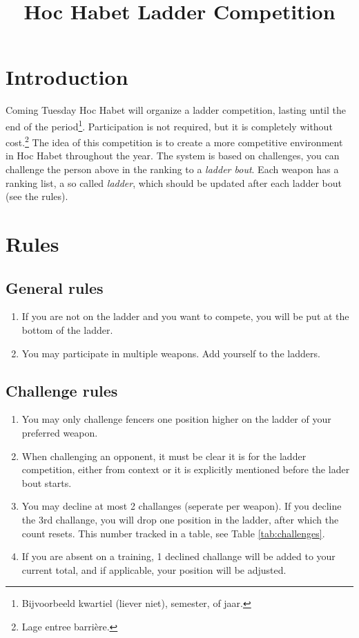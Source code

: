 \documentclass{article}
\title{Hoc Habet Ladder Competition}
\author{}
\date{}
\begin{document}
\maketitle
\section{Introduction}
Coming Tuesday Hoc Habet will organize a ladder competition, lasting until the end of the period\footnote{Bijvoorbeeld kwartiel (liever niet), semester, of jaar.}. Participation is not required, but it is completely without cost.\footnote{Lage entree barrière.} The idea of this competition is to create a more competitive environment in Hoc Habet throughout the year. The system is based on challenges, you can challenge the person above in the ranking to a \emph{ladder bout}. Each weapon has a ranking list, a so called \emph{ladder}, which should be updated after each ladder bout (see the rules). 

\section{Rules}
\subsection{General rules}
\begin{enumerate}
    \item If you are not on the ladder and you want to compete, you will be put at the bottom of the ladder.
    \item You may participate in multiple weapons. Add yourself to the ladders.
\end{enumerate}
\subsection{Challenge rules}
\begin{enumerate}
   \item You may only challenge fencers one position higher on the ladder of your preferred weapon.
   \item When challenging an opponent, it must be clear it is for the ladder competition, either from context or it is explicitly mentioned before the lader bout starts.
   \item You may decline at most 2 challanges (seperate per weapon). If you decline the 3rd challange, you will drop one position in the ladder, after which the count resets. This number tracked in a table, see Table \ref{tab:challenges}.
   \item If you are absent on a training, 1 declined challange will be added to your current total, and if applicable, your position will be adjusted.
\end{enumerate}
\end{document}
